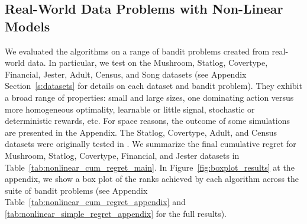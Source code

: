 \documentclass{article} \usepackage{iclr2018_conference,times}
\begin{document}
\subsection{Real-World Data Problems with Non-Linear Models} 
We evaluated the algorithms on a range of bandit problems created from real-world data. In particular, we test on the Mushroom, Statlog, Covertype, Financial, Jester, Adult, Census, and Song datasets (see Appendix Section~\ref{s:datasets} for details on each dataset and bandit problem). They exhibit a broad range of properties: small and large sizes, one dominating action versus more homogeneous optimality, learnable or little signal, stochastic or deterministic rewards, etc. 
For space reasons, the outcome of some simulations are presented in the Appendix.
The Statlog, Covertype, Adult, and Census datasets were originally tested in \cite{elmachtoub2017practical}. We summarize the final cumulative regret for Mushroom, Statlog, Covertype, Financial, and Jester datasets in Table~\ref{tab:nonlinear_cum_regret_main}.  In Figure~\ref{fig:boxplot_results} at the appendix, we show a box plot of the ranks achieved by each algorithm across the suite of bandit problems (see Appendix Table~\ref{tab:nonlinear_cum_regret_appendix} and \ref{tab:nonlinear_simple_regret_appendix} for the full results). 
\end{document}
